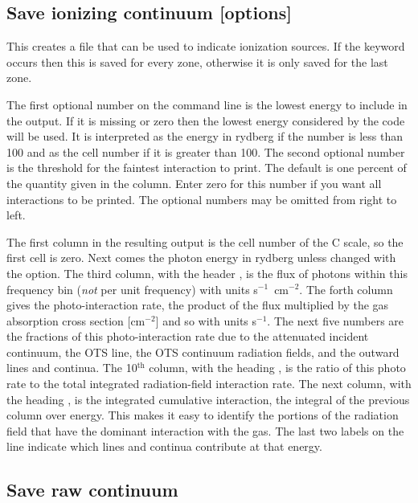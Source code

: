 \subsection{Save ionizing continuum [options]}

This creates a file that can be used to indicate ionization sources.
If the keyword  occurs then this is saved for every zone, otherwise
it is only saved for the last zone.

The first optional number on the command line is the lowest energy to
include in the output.  If it is missing or zero then the lowest energy
considered by the code will be used.  It is interpreted as the energy in
rydberg if the number is less than 100 and as the cell number if it is
greater than 100.  The second optional number is the threshold for the
faintest interaction to print.  The default is one percent of the quantity
given in the  column.
Enter zero for this number if you want
all interactions to be printed.  The optional numbers may be omitted from
right to left.

The first column in the resulting output is the cell number
of the C scale, so the first cell is zero.
Next comes the photon energy
in rydberg unless changed with the  option.  The third column, with
the header , is the flux of photons within this frequency bin
(\emph{not}
per unit frequency) with units s$^{-1}$~cm$^{-2}$.  The forth column gives the
photo-interaction rate, the product of the flux multiplied by the gas
absorption cross section
[cm$^{-2}$] and so with units s$^{-1}$.  The next five numbers are the fractions of
this photo-interaction rate due to the attenuated incident continuum, the
OTS line, the OTS continuum radiation fields, and the outward lines and
continua.  The 10$^{\mathrm{th}}$ column, with the heading , is the ratio
of this photo rate to the total integrated radiation-field interaction rate.
The next column, with the heading , is the integrated cumulative
interaction, the integral of the previous column over energy.  This makes
it easy to identify the portions of the radiation field that have the
dominant interaction with the gas.  The last two labels on the line indicate
which lines and continua contribute at that energy.

\subsection{Save raw continuum}

